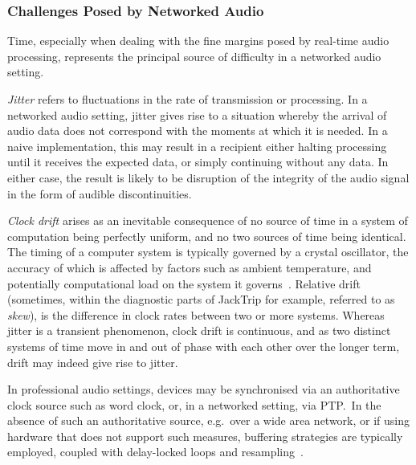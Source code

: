 \subsubsection{Challenges Posed by Networked Audio}\label{subsubsec:challenges}

Time, especially when dealing with the fine margins posed by real-time audio
processing, represents the principal source of difficulty in a networked
audio setting.

\textit{Jitter} refers to fluctuations in the rate of transmission or
processing.
In a networked audio setting, jitter gives rise to a situation whereby the
arrival of audio data does not correspond with the moments at which it is
needed.
In a naive implementation, this may result in a recipient either halting
processing until it receives the expected data, or simply continuing without
any data.
In either case, the result is likely to be disruption of the integrity of the
audio signal in the form of audible discontinuities.

\textit{Clock drift} arises as an inevitable consequence of no source of time
in a system of computation being perfectly uniform, and no two sources of time
being identical.
The timing of a computer system is typically governed by a crystal oscillator,
the accuracy of which is affected by factors such as ambient temperature, and
potentially computational load on the system it
governs~\citep{marouani_internal_2008}.
Relative drift (sometimes, within the diagnostic parts of JackTrip for example,
referred to as \textit{skew}), is the difference in clock rates between two or
more systems.
Whereas jitter is a transient phenomenon, clock drift is continuous, and as two
distinct systems of time move in and out of phase with each other over the
longer term, drift may indeed give rise to jitter.

In professional audio settings, devices may be synchronised via an authoritative
clock source such as word clock, or, in a networked setting, via PTP.\
In the absence of such an authoritative source, e.g.\ over a wide area network,
or if using hardware that does not support such measures, buffering strategies
are typically employed, coupled with delay-locked
loops and resampling~\citep{adriaensen_using_2005, adriaensen_controlling_2012}.
